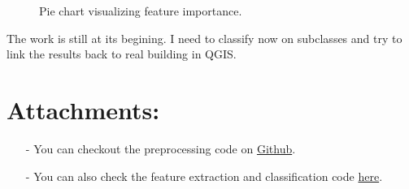 \documentclass[a4paper, 11pt]{article}
\begin{document}
	\begin{figure}[H]
		{
			\caption{\label{fig::feat_import} Pie chart visualizing feature importance.}
		}
	\end{figure}

	The work is still at its begining. I need to classify now on subclasses and try to link the results back to real building in QGIS.

	\section*{Attachments:}
	\begin{itemize}
		\item[-] You can checkout the preprocessing code on
		\href{https://github.com/ethiy/proj.city}{Github}.
		\item[-] You can also check the feature extraction and classification code
		\href{https://github.com/ethiy/qualcity}{here}.
	\end{itemize}
\end{document}

